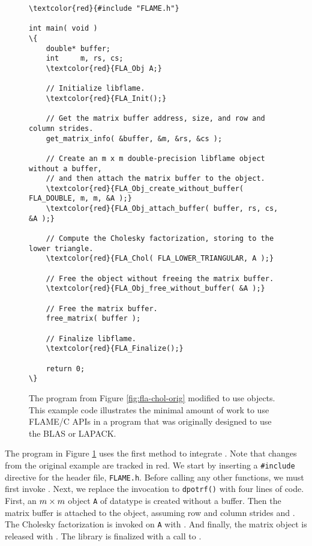 \begin{figure}[t]
\begin{Verbatim}[frame=single,framesep=2.5mm,xleftmargin=5mm,commandchars=\\\{\},fontsize=\footnotesize]
\textcolor{red}{#include "FLAME.h"}

int main( void )
\{
    double* buffer;
    int     m, rs, cs;
    \textcolor{red}{FLA_Obj A;}

    // Initialize libflame.
    \textcolor{red}{FLA_Init();}

    // Get the matrix buffer address, size, and row and column strides.
    get_matrix_info( &buffer, &m, &rs, &cs );

    // Create an m x m double-precision libflame object without a buffer,
    // and then attach the matrix buffer to the object.
    \textcolor{red}{FLA_Obj_create_without_buffer( FLA_DOUBLE, m, m, &A );}
    \textcolor{red}{FLA_Obj_attach_buffer( buffer, rs, cs, &A );}

    // Compute the Cholesky factorization, storing to the lower triangle.
    \textcolor{red}{FLA_Chol( FLA_LOWER_TRIANGULAR, A );}

    // Free the object without freeing the matrix buffer.
    \textcolor{red}{FLA_Obj_free_without_buffer( &A );}

    // Free the matrix buffer.
    free_matrix( buffer );

    // Finalize libflame.
    \textcolor{red}{FLA_Finalize();}

    return 0;
\}
\end{Verbatim}
\caption{
The program from Figure \ref{fig:fla-chol-orig} modified to use \libflame
objects.
This example code illustrates the minimal amount of work to use FLAME/C APIs
in a program that was originally designed to use the BLAS or LAPACK.
}
\label{fig:fla-chol-attach}
\end{figure}

The program in Figure \ref{fig:fla-chol-attach} uses the first method to
integrate \libflamens.
Note that changes from the original example are tracked in red.
We start by inserting a {\tt \#include} directive for the \libflame header
file, {\tt FLAME.h}.
Before calling any other \libflame functions, we must first invoke \flainitns.
Next, we replace the invocation to {\tt dpotrf()} with four lines of
\libflame code.
First, an $ m \times m $ object {\tt A} of datatype \fladouble is created without
a buffer.
Then the matrix buffer \buffer is attached to the \libflame object, assuming
row and column strides \rs and \csns.
The Cholesky factorization is invoked on {\tt A} with \flacholns.
And finally, the matrix object is released with \flaobjfreewithoutbufferns.
The library is finalized with a call to \flafinalizens.


